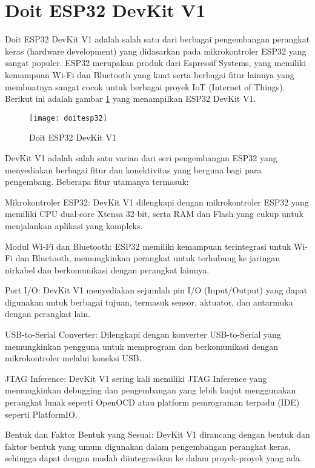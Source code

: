 \section{Doit ESP32 DevKit V1}
Doit ESP32 DevKit V1 adalah salah satu dari berbagai pengembangan perangkat keras (hardware development) yang didasarkan pada mikrokontroler ESP32 yang sangat populer. ESP32 merupakan produk dari Espressif Systems, yang memiliki kemampuan Wi-Fi dan Bluetooth yang kuat serta berbagai fitur lainnya yang membuatnya sangat cocok untuk berbagai proyek IoT (Internet of Things). Berikut ini adalah gambar \cref{fig:ESP} yang menampilkan ESP32 DevKit V1.

\begin{figure}[H]
	\centering
	\texttt{[image: doitesp32]}
	\caption{Doit ESP32 DevKit V1}
	\label{fig:ESP}
\end{figure}

DevKit V1 adalah salah satu varian dari seri pengembangan ESP32 yang menyediakan berbagai fitur dan konektivitas yang berguna bagi para pengembang. Beberapa fitur utamanya termasuk:
\begin{packed_item}
	\item Mikrokontroler ESP32: DevKit V1 dilengkapi dengan mikrokontroler ESP32 yang memiliki CPU dual-core Xtensa 32-bit, serta RAM dan Flash yang cukup untuk menjalankan aplikasi yang kompleks.
	\item Modul Wi-Fi dan Bluetooth: ESP32 memiliki kemampuan terintegrasi untuk Wi-Fi dan Bluetooth, memungkinkan perangkat untuk terhubung ke jaringan nirkabel dan berkomunikasi dengan perangkat lainnya.
	\item Port I/O: DevKit V1 menyediakan sejumlah pin I/O (Input/Output) yang dapat digunakan untuk berbagai tujuan, termasuk sensor, aktuator, dan antarmuka dengan perangkat lain.
	\item USB-to-Serial Converter: Dilengkapi dengan konverter USB-to-Serial yang memungkinkan pengguna untuk memprogram dan berkomunikasi dengan mikrokontroler melalui koneksi USB.
	\item JTAG Inference: DevKit V1 sering kali memiliki  JTAG Inference yang memungkinkan debugging dan pengembangan yang lebih lanjut menggunakan perangkat lunak seperti OpenOCD atau platform pemrograman terpadu (IDE) seperti PlatformIO.
	\item Bentuk dan Faktor Bentuk yang Sesuai: DevKit V1 dirancang dengan bentuk dan faktor bentuk yang umum digunakan dalam pengembangan perangkat keras, sehingga dapat dengan mudah diintegrasikan ke dalam proyek-proyek yang ada.
\end{packed_item}

